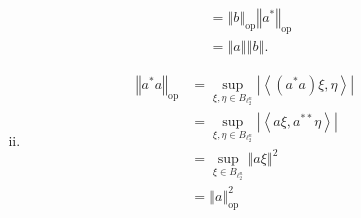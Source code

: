 \documentclass[9pt]{extarticle}
\newcommand{\iprod}[2]{\left\langle #1,#2\right\rangle}
\newcommand{\norm}[1]{\left\Vert #1\right\Vert}
\begin{document}
\begin{description}
\begin{enumerate}[(i)]
\begin{align*}
                                  &= \norm{b}_{\text{op}}\norm{a^{\ast}}_{\text{op}}\\
                                  &= \norm{a}\norm{b}.
          \end{align*}
        \item 
          \begin{align*}
            \norm{a^{\ast}a}_{\text{op}} &= \sup_{\xi,\eta\in B_{\ell_2^n}}|\iprod{(a^{\ast}a)\xi}{\eta}|\\
                                         &= \sup_{\xi,\eta \in B_{\ell_2^n}}|\iprod{a\xi}{a^{\ast\ast}\eta}|\\
                                         &= \sup_{\xi\in B_{\ell_2^n}}\norm{a\xi}^{2}\\
                                         &= \norm{a}_{\text{op}}^{2}
          \end{align*}
      \end{enumerate}
  \end{description}
\end{document}

